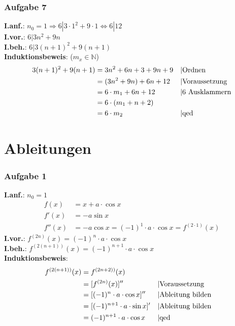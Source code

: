 \subsubsection{Aufgabe 7}
\textbf{I.anf.}: $ n_0 = 1 \Rightarrow 6|3\cdot1^2 +9\cdot1 \Leftrightarrow 6|12$\\
\textbf{I.vor.}: $ 6 | 3n^2 + 9n $\\
\textbf{I.beh.}: $ 6 | 3(n+1)^2 + 9(n+1) $\\
\textbf{Induktionsbeweis}: ($m_x \in \mathbb{N}$)\begin{align*}
3(n+1)^2 + 9(n+1) &= 3n^2+6n+3+9n+9			&& \text{\textbar Ordnen}\\
									&= (3n^2 + 9n) + 6n + 12 		&& \text{\textbar Voraussetzung}\\
									&= 6 \cdot m_1 + 6n + 12 		&& \text{\textbar $6$ Ausklammern}\\
									&= 6 \cdot (m_1 + n + 2) 		\\
									&= 6 \cdot m_2 							&& \text{\textbar qed}\end{align*}
\section{Ableitungen}
\subsubsection{Aufgabe 1}
\textbf{I.anf.}: $ n_0 = 1 $\begin{align*}
f(x) &= x + a\cdot \cos x\\
f'(x) &= -a \sin x \\
f''(x) &= - a \cos x = (-1)^1\cdot a\cdot \cos x = f^{(2\cdot 1)}(x)\end{align*}
\textbf{I.vor.}: $ f^{(2n)}(x) = (-1)^n \cdot a \cdot \cos x $\\
\textbf{I.beh.}: $ f^{(2(n+1))}(x) = (-1)^{n+1} \cdot a \cdot \cos x $\\
\textbf{Induktionsbeweis}:\begin{align*}
f^{(2(n+1))}(x) &= f^{(2n+2))}(x) \\
								&= [f^{(2n)}(x)]''  		&& \text{\textbar Voraussetzung}\\
								&= [(-1)^n \cdot a \cdot \cos x]'' 	&& \text{\textbar Ableitung bilden}\\
								&= [(-1)^{n+1} \cdot a \cdot \sin x]' && \text{\textbar Ableitung bilden}\\
								&= (-1)^{n+1} \cdot a \cdot \cos x 		&& \text{\textbar qed}\end{align*}

